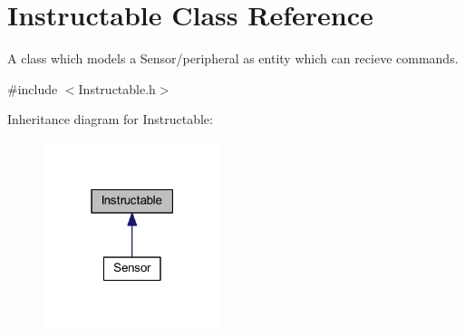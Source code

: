 \hypertarget{class_instructable}{}\section{Instructable Class Reference}
\label{class_instructable}


A class which models a Sensor/peripheral as entity which can recieve commands.  




{\ttfamily \#include $<$Instructable.\+h$>$}



Inheritance diagram for Instructable\+:
\nopagebreak
\begin{figure}[H]
\begin{center}
\leavevmode
\includegraphics[width=147pt]{class_instructable__inherit__graph}
\end{center}
\end{figure}
